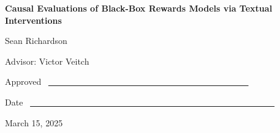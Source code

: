 \documentclass{article}
\theoremstyle{definition}
\begin{document}
    
    \noindent
    \thispagestyle{empty}

    \vspace{1.8in}
    \begin{center}
    {\bf\LARGE Causal Evaluations of Black-Box Rewards Models via Textual Interventions}
    
    \vspace{1.4in}
    {\Large Sean Richardson}
    
    \vspace{1.3in}
    {\Large Advisor: Victor Veitch}
    
    \end{center}
    
    \vspace{.6in}
    {\Large Approved} ~\underline{~~~~~~~~~~~~~~~~~~
    ~~~~~~~~~~~~~~~~~~~~~~~~~~~~}
    
    \vspace{.2in}
    {\Large Date} ~\underline{~~~~~~~~~~~~~~~~~~~~~~~~~~~~~~~~~~~~~~~~~~~~~~~~~~~~~~~~~}
    
    \vfill
    \begin{center}{\large March 15, 2025}\end{center}
    
\end{document}
